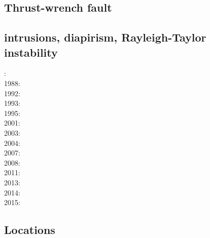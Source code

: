 \noindent
\cite{stoc83}
\cite{dahl84}
\cite{dahl90}
\cite{koon94}
\cite{wiep03}
\cite{rugb14}
\cite{mauw16}
\cite{mauw17}\cite{rugb17}
\cite{elgb19}

\subsection*{Thrust-wrench fault} 

\noindent
\cite{rods15}

\subsection*{intrusions, diapirism, Rayleigh-Taylor instability}

: \cite{brpo81}\\
1988: \cite{sccm88}\\
1992: \cite{vayv92}\cite{zaju92}\cite{wein92}\cite{wesc92}\cite{veja92}\\
1993: \cite{kesb93}\cite{nabr93}\cite{potp93}\cite{povp93}\cite{vasv93}\cite{pocp93}\cite{popt93}\cite{wein93}\\
1995: \cite{wepo95}\cite{bisc95}\cite{wepo95}\\
2001: \cite{kapo01}\\
2003: \cite{geur03}\cite{vavs03}\\
2004: \cite{gepm04}\cite{istt04}\cite{geur04}\\
2007: \cite{gebu07}\\
2008: \cite{buge08}\cite{zlfd08}\cite{mohc98}\\
2011: \cite{ellw11}\cite{pege11}\\
2013: \cite{fusc13}\\
2014: \cite{feka14b}\\
2015: \cite{feka15}\cite{fuks15}


\subsection*{Locations}


